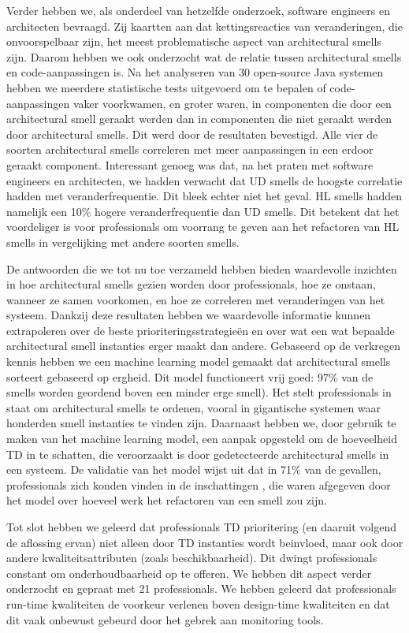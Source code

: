 {Verder hebben we, als onderdeel van hetzelfde onderzoek, software engineers en architecten bevraagd. Zij kaartten aan dat kettingsreacties van veranderingen, die onvoorspelbaar zijn, het meest problematische aspect van architectural smells zijn. Daarom hebben we ook onderzocht wat de relatie tussen architectural smells en code-aanpassingen is. Na het analyseren van 30 open-source Java systemen hebben we meerdere statistische tests uitgevoerd om te bepalen of code-aanpassingen vaker voorkwamen, en groter waren, in componenten die door een architectural smell geraakt werden dan in componenten die niet geraakt werden door architectural smells. Dit werd door de resultaten bevestigd. Alle vier de soorten architectural smells correleren met meer aanpassingen in een erdoor geraakt component. Interessant genoeg was dat, na het praten met software engineers en architecten, we hadden verwacht dat UD smells de hoogste correlatie hadden met veranderfrequentie. Dit bleek echter niet het geval. HL smells hadden namelijk een 10\% hogere veranderfrequentie dan UD smells. Dit betekent dat het voordeliger is voor professionals om voorrang te geven aan het refactoren van HL smells in vergelijking met andere soorten smells. 

De antwoorden die we tot nu toe verzameld hebben bieden waardevolle inzichten in hoe architectural smells gezien worden door professionals, hoe ze onstaan, wanneer ze samen voorkomen, en hoe ze correleren met veranderingen van het systeem. Dankzij deze resultaten hebben we waardevolle informatie kunnen extrapoleren over de beste prioriteringsstrategieën en over wat een wat bepaalde architectural smell instanties erger maakt dan andere. Gebaseerd op de verkregen kennis hebben we een machine learning model gemaakt dat architectural smells sorteert gebaseerd op ergheid. Dit model functioneert vrij goed: 97\% van de smells worden geordend boven een minder erge smell). Het stelt professionals in staat om architectural smells te ordenen, vooral in gigantische systemen waar honderden smell instanties te vinden zijn. Daarnaast hebben we, door gebruik te maken van het machine learning model, een aanpak opgesteld om de hoeveelheid TD in te schatten, die veroorzaakt is door gedetecteerde architectural smells in een systeem. De validatie van het model wijst uit dat in 71\% van de gevallen, professionals zich konden vinden in de inschattingen , die waren afgegeven door het model over hoeveel werk het refactoren van een smell zou zijn.

Tot slot hebben we geleerd dat professionals TD prioritering (en daaruit volgend de aflossing ervan) niet alleen door TD instanties wordt beinvloed, maar ook door andere kwaliteitsattributen (zoals beschikbaarheid). Dit dwingt professionals constant om onderhoudbaarheid op te offeren. We hebben dit aspect verder onderzocht en gepraat met 21 professionals. We hebben geleerd dat professionals run-time kwaliteiten de voorkeur verlenen boven design-time kwaliteiten en dat dit vaak onbewust gebeurd door het gebrek aan monitoring tools. 
}